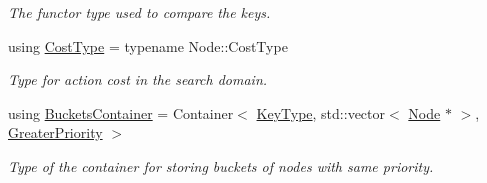 \begin{DoxyCompactItemize}
\begin{DoxyCompactList}\small\item\em The functor type used to compare the keys. \end{DoxyCompactList}\item 
using \hyperlink{structopenList_1_1BucketedStdMap__T_aeefce43f4ef92b8e1170b4b0044f9b76}{Cost\+Type} = typename Node\+::\+Cost\+Type\hypertarget{structopenList_1_1BucketedStdMap__T_aeefce43f4ef92b8e1170b4b0044f9b76}{}\label{structopenList_1_1BucketedStdMap__T_aeefce43f4ef92b8e1170b4b0044f9b76}

\begin{DoxyCompactList}\small\item\em Type for action cost in the search domain. \end{DoxyCompactList}\item 
using \hyperlink{structopenList_1_1BucketedStdMap__T_a7f443991a1790368ac96f78206e87ec9}{Buckets\+Container} = Container$<$ \hyperlink{structopenList_1_1BucketedStdMap__T_a307af8874eba4b74cfd21f73a335bf0c}{Key\+Type}, std\+::vector$<$ \hyperlink{structopenList_1_1BucketedStdMap__T_a54e9b34cd8d421140da4db26b700f5d6}{Node} $\ast$ $>$, \hyperlink{structopenList_1_1BucketedStdMap__T_ac76eb839750868a5c06e371a905a2857}{Greater\+Priority} $>$\hypertarget{structopenList_1_1BucketedStdMap__T_a7f443991a1790368ac96f78206e87ec9}{}\label{structopenList_1_1BucketedStdMap__T_a7f443991a1790368ac96f78206e87ec9}

\begin{DoxyCompactList}\small\item\em Type of the container for storing buckets of nodes with same priority. \end{DoxyCompactList}\end{DoxyCompactItemize}
